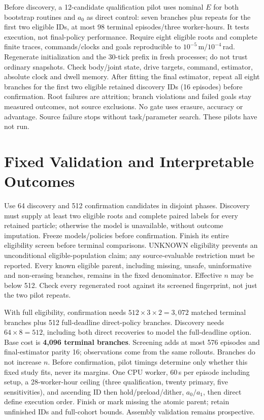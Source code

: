 Before discovery, a 12-candidate qualification pilot uses nominal $E$ for both bootstrap routines and $a_0$ as direct control: seven branches plus repeats for the first two eligible IDs, at most 98 terminal episodes/three worker-hours. It tests execution, not final-policy performance. Require eight eligible roots and complete finite traces, commands/clocks and goals reproducible to $10^{-5}$\,m/$10^{-4}$\,rad. Regenerate initialization and the 30-tick prefix in fresh processes; do not trust ordinary snapshots. Check body/joint state, drive targets, command, estimator, absolute clock and dwell memory. After fitting the final estimator, repeat all eight branches for the first two eligible retained discovery IDs (16 episodes) before confirmation. Root failures are attrition; branch violations and failed goals stay measured outcomes, not source exclusions. No gate uses erasure, accuracy or advantage. Source failure stops without task/parameter search. These pilots have not run.

\section{Fixed Validation and Interpretable Outcomes}
Use 64 discovery and 512 confirmation candidates in disjoint phases. Discovery must supply at least two eligible roots and complete paired labels for every retained particle; otherwise the model is unavailable, without outcome imputation. Freeze models/policies before confirmation. Finish its entire eligibility screen before terminal comparisons. UNKNOWN eligibility prevents an unconditional eligible-population claim; any source-evaluable restriction must be reported. Every known eligible parent, including missing, unsafe, uninformative and non-erasing branches, remains in the fixed denominator. Effective $n$ may be below 512. Check every regenerated root against its screened fingerprint, not just the two pilot repeats.

With full eligibility, confirmation needs $512\times3\times2=3{,}072$ matched terminal branches plus 512 full-deadline direct-policy branches. Discovery needs $64\times8=512$, including both direct recoveries to model the full-deadline option. Base cost is \textbf{4,096 terminal branches}. Screening adds at most 576 episodes and final-estimator parity 16; observations come from the same rollouts. Branches do not increase $n$. Before confirmation, pilot timings determine only whether this fixed study fits, never its margins. One CPU worker, 60\,s per episode including setup, a 28-worker-hour ceiling (three qualification, twenty primary, five sensitivities), and ascending ID then hold/preload/dither, $a_0/a_1$, then direct define execution order. Finish or mark missing the atomic parent; retain unfinished IDs and full-cohort bounds. Assembly validation remains prospective.

